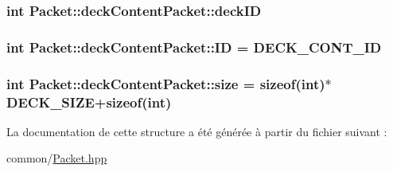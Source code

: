 \subsubsection[{deck\+I\+D}]{\setlength{\rightskip}{0pt plus 5cm}int Packet\+::deck\+Content\+Packet\+::deck\+I\+D}\label{structPacket_1_1deckContentPacket_a3964261af7fcc399035c6d6f78215619}
\hypertarget{structPacket_1_1deckContentPacket_a00cd7c008d480f9dd7e7347e8d6d0842}{}
\subsubsection[{I\+D}]{\setlength{\rightskip}{0pt plus 5cm}int Packet\+::deck\+Content\+Packet\+::\+I\+D = {\bf D\+E\+C\+K\+\_\+\+C\+O\+N\+T\+\_\+\+I\+D}}\label{structPacket_1_1deckContentPacket_a00cd7c008d480f9dd7e7347e8d6d0842}
\hypertarget{structPacket_1_1deckContentPacket_a35c756dcec8f7d81db66f2d188451f38}{}
\subsubsection[{size}]{\setlength{\rightskip}{0pt plus 5cm}int Packet\+::deck\+Content\+Packet\+::size = sizeof(int)$\ast${\bf D\+E\+C\+K\+\_\+\+S\+I\+Z\+E}+sizeof(int)}\label{structPacket_1_1deckContentPacket_a35c756dcec8f7d81db66f2d188451f38}


La documentation de cette structure a été générée à partir du fichier suivant \+:\begin{DoxyCompactItemize}
\item 
common/\hyperlink{Packet_8hpp}{Packet.\+hpp}\end{DoxyCompactItemize}
